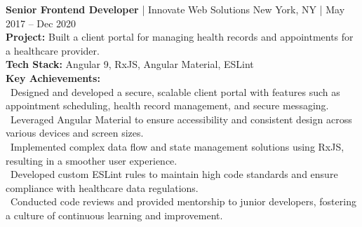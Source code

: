 {\textbf{Senior Frontend Developer} | Innovate Web Solutions \hfill New York, NY | May 2017 – Dec 2020} \\
\textbf{Project:} Built a client portal for managing health records and appointments for a healthcare provider. \\
\textbf{Tech Stack:} Angular 9, RxJS, Angular Material, ESLint \\
\textbf{Key Achievements:} \\
\hspace*{4pt} \textbullet~Designed and developed a secure, scalable client portal with features such as appointment scheduling, health record management, and secure messaging. \\
\hspace*{4pt} \textbullet~Leveraged Angular Material to ensure accessibility and consistent design across various devices and screen sizes. \\
\hspace*{4pt} \textbullet~Implemented complex data flow and state management solutions using RxJS, resulting in a smoother user experience. \\
\hspace*{4pt} \textbullet~Developed custom ESLint rules to maintain high code standards and ensure compliance with healthcare data regulations. \\
\hspace*{4pt} \textbullet~Conducted code reviews and provided mentorship to junior developers, fostering a culture of continuous learning and improvement. \\[4pt]
